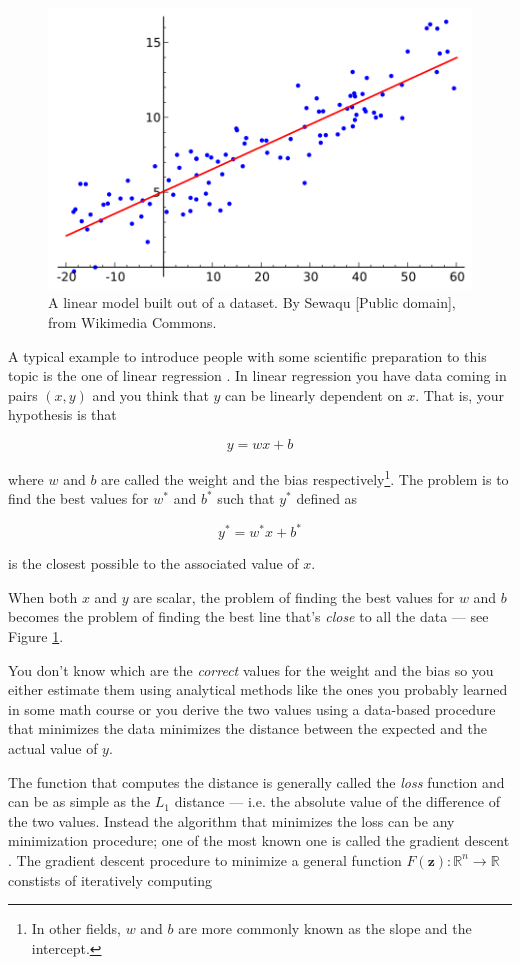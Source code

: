 \begin{figure}
  \centering
  \includegraphics[width=0.5\linewidth]{wikipedia-linear-regression.png}
  \caption{A linear model built out of a dataset. By Sewaqu [Public
      domain], from Wikimedia Commons.}
  \label{fig:wikipedia-linear-regression}
\end{figure}

A typical example to introduce people with some scientific preparation
to this topic is the one of linear regression \cite{B071JXYDDB}. In
linear regression you have data coming in pairs $(x, y)$ and you think
that $y$ can be linearly dependent on $x$. That is, your hypothesis is
that

\begin{equation}
  y = w x + b
  \label{eq:linear-model}
\end{equation}

where $w$ and $b$ are called the weight and the bias
respectively\footnote{In other fields, $w$ and $b$ are more commonly
  known as the slope and the intercept.}. The problem is to find the
best values for $w^*$ and $b^*$ such that $y^*$ defined as

\[ y^* = w^* x + b^* \]

is the closest possible to the associated value of $x$.

When both $x$ and $y$ are scalar, the problem of finding the best
values for $w$ and $b$ becomes the problem of finding the best line
that's \emph{close} to all the data --- see Figure
\ref{fig:wikipedia-linear-regression}.

You don't know which are the \emph{correct} values for the weight and
the bias so you either estimate them using analytical methods like the ones
you probably learned in some math course or you derive the two values
using a data-based procedure that minimizes the data minimizes the
distance between the expected and the actual value of $y$.

The function that computes the distance is generally called the
\emph{loss} function and can be as simple as the $L_1$ distance
\cite{taxicab-geometry} --- i.e. the absolute value of the difference
of the two values. Instead the algorithm that minimizes the loss can be
any minimization procedure; one of the most known one is called the
gradient descent \cite{Goodfellow-et-al-2016}. The gradient descent
procedure to minimize a general function $F(\boldsymbol{z}):
\mathbb{R}^n \rightarrow \mathbb{R}$ constists of iteratively computing

